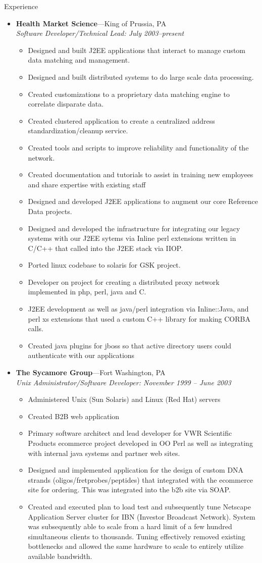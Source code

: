\documentclass[11pt,oneside]{article}
\newenvironment{ressection}[1]{
	\vspace{4pt}
	{\fontfamily{phv}\selectfont\Large#1}
	\begin{itemize}
	\vspace{3pt}
}{
	\end{itemize}
}
\newcommand{\ressubitem}[1]{
	\vspace{-1pt}
	\item \begin{flushleft} #1 \end{flushleft}
}
\newcommand{\resbigitem}[3]{
	\vspace{-5pt}
	\item
	\textbf{#1}---#2 \\
	\textit{#3}
}
\newenvironment{ressubsec}[3]{
	\resbigitem{#1}{#2}{#3}
	\vspace{-2pt}
	\begin{itemize}
}{
	\end{itemize}
}
\begin{document}
\begin{ressection}{Experience}
	\begin{ressubsec}{Health Market Science}{King of Prussia, PA}{Software Developer/Technical Lead: July 2003--present}
		\ressubitem{Designed and built J2EE applications that interact to manage custom data matching and management.}
		\ressubitem{Designed and built distributed systems to do large scale data processing.}
		\ressubitem{Created customizations to a proprietary data matching engine to correlate disparate data.}
		\ressubitem{Created clustered application to create a centralized address standardization/cleanup service.}
		\ressubitem{Created tools and scripts to improve reliability and functionality of the network.}
		\ressubitem{Created documentation and tutorials to assist in training new employees and share expertise with existing staff}
	        \ressubitem{Designed and developed J2EE applications to augment our core Reference Data projects.}
	        \ressubitem{Designed and developed the infrastructure for integrating our legacy systems with our J2EE sytems via Inline perl extensions written in C/C++ that called into the J2EE stack via IIOP.}
	        \ressubitem{Ported linux codebase to solaris for GSK project.}
	        \ressubitem{Developer on project for creating a distributed proxy network implemented in php, perl, java and C.}
	        \ressubitem{J2EE development as well as java/perl integration via Inline::Java, and perl xs extensions that used a custom C++ library for making CORBA calls.}
                \ressubitem{Created java plugins for jboss so that active directory users could authenticate with our applications}
	\end{ressubsec}
	\begin{ressubsec}{The Sycamore Group}{Fort Washington, PA}{Unix Administrator/Software Developer: November 1999 -- June 2003}
		\ressubitem{Administered Unix (Sun Solaris) and Linux (Red Hat) servers}
		\ressubitem{Created B2B web application}
	        \ressubitem{Primary software architect and lead developer for VWR Scientific Products ecommerce project developed in OO Perl as well as integrating with internal java systems and partner web sites. }
	        \ressubitem{Designed and implemented application for the design of custom DNA strands (oligos/fretprobes/peptides) that integrated with the ecommerce site for ordering. This was integrated into the b2b site via SOAP.}
	        \ressubitem{Created and executed plan to load test and subsequently tune Netscape Application Server cluster for IBN (Investor Broadcast Network). System was subsequently able to scale from a hard limit of a few hundred simultaneous clients to thousands. Tuning effectively removed existing bottlenecks and allowed the same hardware to scale to entirely utilize available bandwidth. }

\end{ressubsec}
\end{ressection}
\end{document}
